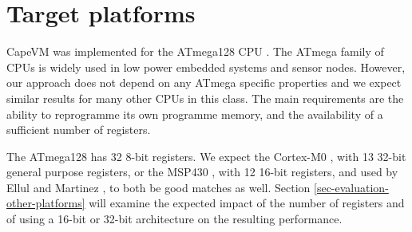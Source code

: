 \section{Target platforms}
CapeVM was implemented for the ATmega128 CPU \cite{Atmel:ATmega128Datasheet}. The ATmega family of CPUs is widely used in low power embedded systems and sensor nodes. However, our approach does not depend on any ATmega specific properties and we expect similar results for many other CPUs in this class. The main requirements are the ability to reprogramme its own programme memory, and the availability of a sufficient number of registers.

The ATmega128 has 32 8-bit registers. We expect the Cortex-M0 \cite{ARM:2009vz}, with 13 32-bit general purpose registers, or the MSP430 \cite{TexasInstrumentsIncorporated:MSP430F1611Datasheet}, with 12 16-bit registers, and used by Ellul and Martinez \cite{Ellul:2010iw}, to both be good matches as well. Section \ref{sec-evaluation-other-platforms} will examine the expected impact of the number of registers and of using a 16-bit or 32-bit architecture on the resulting performance.
